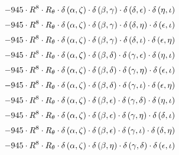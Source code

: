 \begin{subequations}
\begin{gather}
 \\[0.2em] \notag 		 - 945 \cdot R^{8} \cdot R_{\theta{}} \cdot \delta{}\left(\alpha{}, \zeta{}\right) \cdot \delta{}\left(\beta{}, \gamma{}\right) \cdot \delta{}\left(\delta{}, \epsilon{}\right) \cdot \delta{}\left(\eta{}, \iota{}\right) 
 \\[0.2em] \notag 		 - 945 \cdot R^{8} \cdot R_{\theta{}} \cdot \delta{}\left(\alpha{}, \zeta{}\right) \cdot \delta{}\left(\beta{}, \gamma{}\right) \cdot \delta{}\left(\delta{}, \eta{}\right) \cdot \delta{}\left(\epsilon{}, \iota{}\right) 
 \\[0.2em] \notag 		 - 945 \cdot R^{8} \cdot R_{\theta{}} \cdot \delta{}\left(\alpha{}, \zeta{}\right) \cdot \delta{}\left(\beta{}, \gamma{}\right) \cdot \delta{}\left(\delta{}, \iota{}\right) \cdot \delta{}\left(\epsilon{}, \eta{}\right) 
 \\[0.2em] \notag 		 - 945 \cdot R^{8} \cdot R_{\theta{}} \cdot \delta{}\left(\alpha{}, \zeta{}\right) \cdot \delta{}\left(\beta{}, \delta{}\right) \cdot \delta{}\left(\gamma{}, \epsilon{}\right) \cdot \delta{}\left(\eta{}, \iota{}\right) 
 \\[0.2em] \notag 		 - 945 \cdot R^{8} \cdot R_{\theta{}} \cdot \delta{}\left(\alpha{}, \zeta{}\right) \cdot \delta{}\left(\beta{}, \delta{}\right) \cdot \delta{}\left(\gamma{}, \eta{}\right) \cdot \delta{}\left(\epsilon{}, \iota{}\right) 
 \\[0.2em] \notag 		 - 945 \cdot R^{8} \cdot R_{\theta{}} \cdot \delta{}\left(\alpha{}, \zeta{}\right) \cdot \delta{}\left(\beta{}, \delta{}\right) \cdot \delta{}\left(\gamma{}, \iota{}\right) \cdot \delta{}\left(\epsilon{}, \eta{}\right) 
 \\[0.2em] \notag 		 - 945 \cdot R^{8} \cdot R_{\theta{}} \cdot \delta{}\left(\alpha{}, \zeta{}\right) \cdot \delta{}\left(\beta{}, \epsilon{}\right) \cdot \delta{}\left(\gamma{}, \delta{}\right) \cdot \delta{}\left(\eta{}, \iota{}\right) 
 \\[0.2em] \notag 		 - 945 \cdot R^{8} \cdot R_{\theta{}} \cdot \delta{}\left(\alpha{}, \zeta{}\right) \cdot \delta{}\left(\beta{}, \epsilon{}\right) \cdot \delta{}\left(\gamma{}, \eta{}\right) \cdot \delta{}\left(\delta{}, \iota{}\right) 
 \\[0.2em] \notag 		 - 945 \cdot R^{8} \cdot R_{\theta{}} \cdot \delta{}\left(\alpha{}, \zeta{}\right) \cdot \delta{}\left(\beta{}, \epsilon{}\right) \cdot \delta{}\left(\gamma{}, \iota{}\right) \cdot \delta{}\left(\delta{}, \eta{}\right) 
 \\[0.2em] \notag 		 - 945 \cdot R^{8} \cdot R_{\theta{}} \cdot \delta{}\left(\alpha{}, \zeta{}\right) \cdot \delta{}\left(\beta{}, \eta{}\right) \cdot \delta{}\left(\gamma{}, \delta{}\right) \cdot \delta{}\left(\epsilon{}, \iota{}\right) 

\end{gather}
\end{subequations}
